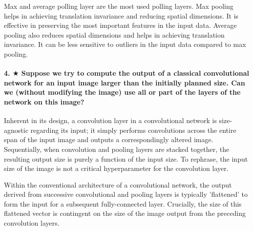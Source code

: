 \documentclass{article}
\theoremstyle{plain}%
\theoremstyle{definition}
\theoremstyle{remark}
\begin{document}
Max and average polling layer are the most used polling layers. Max pooling helps in achieving translation invariance and reducing spatial dimensions. It is effective in preserving the most important features in the input data. Average pooling also reduces spatial dimensions and helps in achieving translation invariance. It can be less sensitive to outliers in the input data compared to max pooling.

\paragraph{4. $ \bigstar $ Suppose we try to compute the output of a classical convolutional network for an input image larger than the initially planned size. Can we (without modifying the image) use all or part of the layers of the network on this image?}



Inherent in its design, a convolution layer in a convolutional network is size-agnostic regarding its input; it simply performs convolutions across the entire span of the input image and outputs a correspondingly altered image. Sequentially, when convolution and pooling layers are stacked together, the resulting output size is purely a function of the input size. To rephrase, the input size of the image is not a critical hyperparameter for the convolution layer.

Within the conventional architecture of a convolutional network, the output derived from successive convolutional and pooling layers is typically 'flattened' to form the input for a subsequent fully-connected layer. Crucially, the size of this flattened vector is contingent on the size of the image output from the preceding convolution layers.
\end{document}

